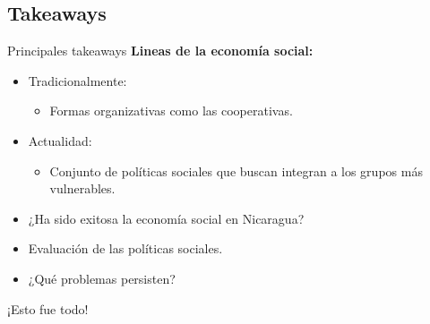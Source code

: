 \documentclass[11pt, aspectratio=169, compress]{beamer}
\makeatletter
\def\beamer@writeslidentry@miniframesoff{%
	\expandafter\beamer@ifempty\expandafter{\beamer@framestartpage}{}%
	{%
		\clearpage\beamer@notesactions%
	}
}
\newcommand*{\miniframesoff}{\let\beamer@writeslidentry=\beamer@writeslidentry@miniframesoff}
\makeatother
\begin{document}
\subsection{Takeaways}
\begin{frame}[t]{Principales takeaways}
	\textbf{Lineas de la economía social:}
	\begin{itemize}
		\item Tradicionalmente: 
		\begin{itemize}
			\item Formas organizativas como las cooperativas. 
		\end{itemize}
		\item Actualidad:
		\begin{itemize}
			\item  Conjunto de políticas sociales que buscan integran a los grupos más vulnerables. 
		\end{itemize}
		\item ¿Ha sido exitosa la economía social en Nicaragua?
		\item Evaluación de las políticas sociales.
		\item ¿Qué problemas persisten?
	\end{itemize}
\end{frame}

\miniframesoff 	
\begin{frame}
¡Esto fue todo! 
\end{frame}
\end{document}
